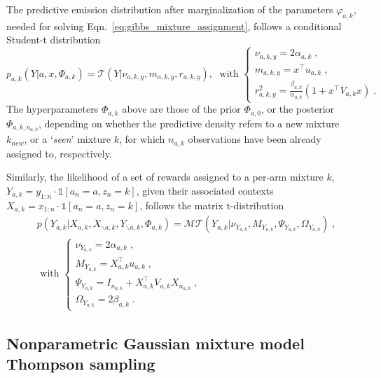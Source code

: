 \documentclass{article}
\newcommand{\T}[1]{\mathcal{T}\left( #1\right)}
\newcommand{\MT}[1]{\mathcal{MT}\left( #1\right)}
\begin{document}
The predictive emission distribution after marginalization of the parameters $\varphi_{a,k}$, needed for solving Eqn.~\eqref{eq:gibbs_mixture_assignment}, follows a conditional Student-t distribution
\begin{equation}
p_{a,k}(Y|a,x,\varPhi_{a,k}) = \T{Y|\nu_{a,k,y}, m_{a,k,y}, r_{a,k,y}}, \; \text{ with }
\begin{cases}
\nu_{a,k,y}=2\alpha_{a,k} \;, \\
m_{a,k,y} = x^\top u_{a,k} \;, \\
r_{a,k,y}^2 = \frac{\beta_{a,k}}{\alpha_{a,k}} (1+x^\top V_{a,k} x) \; .
\end{cases}
\label{eq:predictive_emission_univariate}
\end{equation}
The hyperparameters $\varPhi_{a,k}$ above are those of the prior $\varPhi_{a,0}$, or the posterior $\varPhi_{a,k,n_{a,k}}$, depending on whether the predictive density refers to a new mixture $k_{new}$, or a `\textit{seen}' mixture $k$, for which $n_{a,k}$ observations have been already assigned to, respectively.

Similarly, the likelihood of a set of rewards assigned to a per-arm mixture $k$, $Y_{a,k}=y_{1:n}\cdot \mathds{1}[a_n=a,z_n=k]$, given their associated contexts $X_{a,k}=x_{1:n} \cdot \mathds{1}[a_n=a,z_n=k]$, follows the matrix t-distribution
\begin{equation}
\begin{split}
& p(Y_{a,k}|X_{a,k},X_{\backslash a,k},Y_{\backslash a,k},\varPhi_{a,k}) = \MT{Y_{a,k}|\nu_{Y_{a,k}}, M_{Y_{a,k}}, \Psi_{Y_{a,k}}, \Omega_{Y_{a,k}}} \; , \\
& \text{ with }
\begin{cases}
\nu_{Y_{a,k}}=2 \alpha_{a,k} \;, \\
M_{Y_{a,k}}= X_{a,k}^\top u_{a,k} \;, \\
\Psi_{Y_{a,k}} = I_{n_{a,k}} + X_{a,k}^\top V_{a,k} X_{n_{a,k}} \;, \\
\Omega_{Y_{a,k}} = 2 \beta_{a,k} \; .
\end{cases}
\end{split}
\label{eq:predictive_emission_multivariate}
\end{equation}

\subsection{Nonparametric Gaussian mixture model Thompson sampling}
\label{ssec:nonparametric_thompson_sampling}
\end{document}
